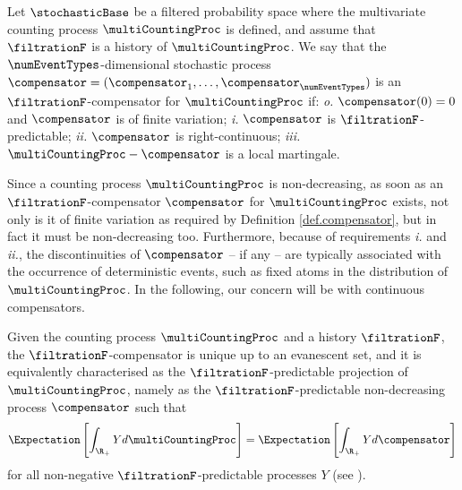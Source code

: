 \begin{defi}\label{def.compensator}
 Let $\stochasticBase$ be a filtered probability space where the multivariate counting process
 $\multiCountingProc$ is defined,
 and assume that $\filtrationF$ is a history of $\multiCountingProc$.
 We say that the $\numEventTypes$-dimensional stochastic process
 $\compensator = (\compensator_1, \dots , \compensator_{\numEventTypes})$
 is an $\filtrationF$-compensator for $\multiCountingProc$ if:
 \emph{o.} $\compensator(0)=0$ and $\compensator$ is of finite variation;
 \emph{i.} $\compensator$ is $\filtrationF$-predictable;
 \emph{ii.} $\compensator$ is right-continuous;
 \emph{iii.} $\multiCountingProc - \compensator$ is a local martingale.
\end{defi}

Since a counting process $\multiCountingProc$ is non-decreasing,
as soon as an $\filtrationF$-compensator $\compensator$ for $\multiCountingProc$ exists,
not only is it of finite variation as required by Definition \ref{def.compensator},
but in fact it must be non-decreasing too.
Furthermore, because of requirements \emph{i.} and \emph{ii.},
the discontinuities of $\compensator$ -- if any --
are typically associated with the occurrence of deterministic events,
such as fixed atoms in the distribution of $\multiCountingProc$.
In the following, our concern will be with continuous compensators.

Given the counting process $\multiCountingProc$ and a history $\filtrationF$,
the $\filtrationF$-compensator is unique up to an evanescent set,
and it is equivalently characterised as the $\filtrationF$-predictable projection of
$\multiCountingProc$,
namely as the $\filtrationF$-predictable non-decreasing process $\compensator$ such that
\begin{equation}\label{eq.compensators_and_predict_projections}
 \Expectation \left[ \int_{\R_+} Y d\multiCountingProc\right]
 =
 \Expectation \left[ \int_{\R_+} Y d\compensator\right]
\end{equation}
for all non-negative $\filtrationF$-predictable processes $Y$
(see \cite[Proposition 14.2.II]{DVJ08int}).


